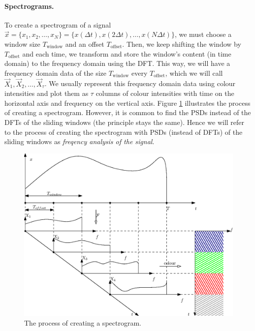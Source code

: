 		\paragraph{Spectrograms.}
			To create a spectrogram of a signal $\vec x = \{x_1, x_2, \dotsc, x_N\} = \{x(\Delta t), x(2\Delta t), \dotsc, x(N\Delta t)\}$, we must choose a window size $T_\text{window}$ and an offset $T_\text{offset}$. Then, we keep shifting the window by $T_\text{offset}$ and each time, we transform and store the window's content (in time domain) to the frequency domain using the DFT. This way, we will have a frequency domain data of the size $T_\text{window}$ every $T_\text{offset}$, which we will call $\vec X_1, \vec X_2, \dotsc, \vec X_\tau$. We usually represent this frequency domain data using colour intensities and plot them as $\tau$ columns of colour intensities with time on the horizontal axis and frequency on the vertical axis. Figure \ref{fig:spec} illustrates the process of creating a spectrogram. However, it is common to find the PSDs instead of the DFTs of the sliding windows (the principle stays the same). Hence we will refer to the process of creating the spectrogram with PSDs (instead of DFTs) of the sliding windows as \emph{freqency analysis of the signal}.
			\begin{figure}[h!]
				\centering
					\includegraphics{drawings/spec.eps}
				\caption{The process of creating a spectrogram.}
				\label{fig:spec}
			\end{figure}


